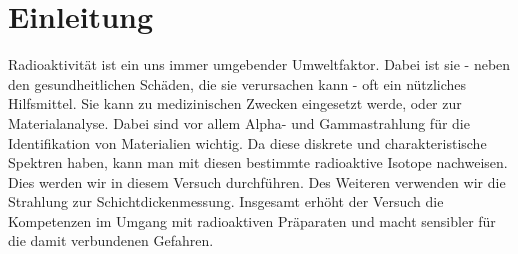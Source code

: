 

\chapter{Einleitung}
\label{chap:einleitung}

Radioaktivität ist ein uns immer umgebender Umweltfaktor. Dabei ist sie - neben den gesundheitlichen Schäden, die sie verursachen 
kann - oft ein nützliches Hilfsmittel. Sie kann zu medizinischen Zwecken eingesetzt werde, oder zur Materialanalyse. 
Dabei sind vor allem Alpha- und Gammastrahlung für die Identifikation von Materialien wichtig. Da diese diskrete und charakteristische 
Spektren haben, kann man mit diesen bestimmte radioaktive Isotope nachweisen. Dies werden wir in diesem Versuch durchführen. Des Weiteren 
verwenden wir die Strahlung zur Schichtdickenmessung. Insgesamt erhöht der Versuch die Kompetenzen im Umgang mit radioaktiven Präparaten und 
macht sensibler für die damit verbundenen Gefahren.
